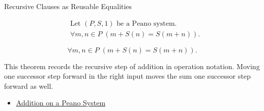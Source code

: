 \begin{topicbox}{Recursive Clauses as Reusable Equalities}
\begin{remark*}
\[
\begin{aligned}
&\text{Let } (P,S,1) \text{ be a Peano system.}\\
&\forall m,n \in P\;(m+S(n)=S(m+n)).
\end{aligned}
\]
\end{remark*}

\begin{remark*}
\[
\forall m,n \in P\;(m+S(n)=S(m+n)).
\]
\end{remark*}

\begin{remark*}[Interpretation]
This theorem records the recursive step of addition in operation notation.
Moving one successor step forward in the right input moves the sum one
successor step forward as well.
\end{remark*}

\begin{dependencies}
\begin{itemize}
  \item \hyperref[def:addition-on-peano-system]{Addition on a Peano System}
\end{itemize}
\end{dependencies}
\end{topicbox}


